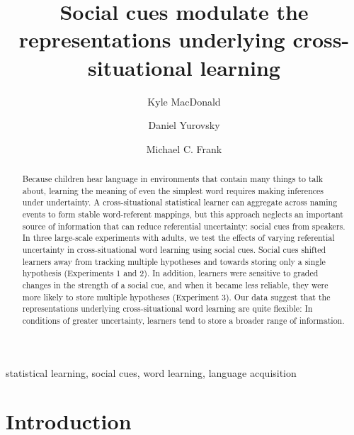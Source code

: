 \documentclass[authoryear, review]{elsarticle}
\date{}
\begin{document}
\begin{frontmatter}

\title{Social cues modulate the representations underlying cross-situational
learning}

\author[km]{Kyle MacDonald}
\author[dy]{Daniel Yurovsky}
\author[mcf]{Michael C. Frank}
\address{Department of Psychology, Stanford University, United States}


\begin{abstract}
Because children hear language in environments that contain many things
to talk about, learning the meaning of even the simplest word requires
making inferences under undertainty. A cross-situational statistical
learner can aggregate across naming events to form stable word-referent
mappings, but this approach neglects an important source of information
that can reduce referential uncertainty: social cues from speakers. In
three large-scale experiments with adults, we test the effects of
varying referential uncertainty in cross-situational word learning using
social cues. Social cues shifted learners away from tracking multiple
hypotheses and towards storing only a single hypothesis (Experiments 1
and 2). In addition, learners were sensitive to graded changes in the
strength of a social cue, and when it became less reliable, they were
more likely to store multiple hypotheses (Experiment 3). Our data
suggest that the representations underlying cross-situational word
learning are quite flexible: In conditions of greater uncertainty,
learners tend to store a broader range of information.
\end{abstract}

\begin{keyword}
statistical learning, social cues, word learning, language acquisition
\end{keyword}

\end{frontmatter}

\section{Introduction}\label{introduction}
\end{document}
